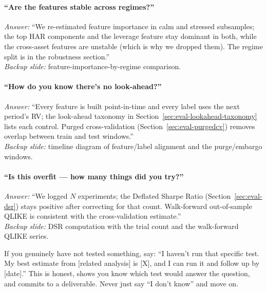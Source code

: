 \paragraph{``Are the features stable across regimes?''}
\emph{Answer:} ``We re-estimated feature importance in calm and stressed subsamples; the top HAR components and the leverage feature stay dominant in both, while the cross-asset features are unstable (which is why we dropped them). The regime split is in the robustness section.''\\
\noindent\emph{Backup slide:} feature-importance-by-regime comparison.

\paragraph{``How do you know there's no look-ahead?''}
\emph{Answer:} ``Every feature is built point-in-time and every label uses the next period's RV; the look-ahead taxonomy in Section~\ref{sec:eval-lookahead-taxonomy} lists each control. Purged cross-validation (Section~\ref{sec:eval-purgedcv}) removes overlap between train and test windows.''\\
\noindent\emph{Backup slide:} timeline diagram of feature/label alignment and the purge/embargo windows.

\paragraph{``Is this overfit --- how many things did you try?''}
\emph{Answer:} ``We logged $N$ experiments; the Deflated Sharpe Ratio (Section~\ref{sec:eval-dsr}) stays positive after correcting for that count. Walk-forward out-of-sample QLIKE is consistent with the cross-validation estimate.''\\
\noindent\emph{Backup slide:} DSR computation with the trial count and the walk-forward QLIKE series.

\begin{warning}
If you genuinely have not tested something, say: ``I haven't run that specific test. My best estimate from [related analysis] is [X], and I can run it and follow up by [date].'' This is honest, shows you know which test would answer the question, and commits to a deliverable. Never just say ``I don't know'' and move on.
\end{warning}

